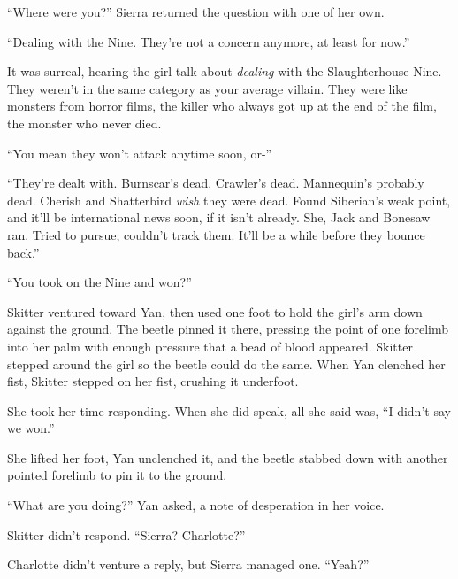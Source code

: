 ``Where were you?'' Sierra returned the question with one of her own.



``Dealing with the Nine.  They're not a concern anymore, at least for now.''



It was surreal, hearing the girl talk about \emph{dealing} with the Slaughterhouse Nine.  They weren't in the same category as your average villain.  They were like monsters from horror films, the killer who always got up at the end of the film, the monster who never died.



``You mean they won't attack anytime soon, or-''



``They're dealt with.  Burnscar's dead.  Crawler's dead.  Mannequin's probably dead.  Cherish and Shatterbird \emph{wish} they were dead.  Found Siberian's weak point, and it'll be international news soon, if it isn't already.  She, Jack and Bonesaw ran.  Tried to pursue, couldn't track them.  It'll be a while before they bounce back.''



``You took on the Nine and won?''



Skitter ventured toward Yan, then used one foot to hold the girl's arm down against the ground.  The beetle pinned it there, pressing the point of one forelimb into her palm with enough pressure that a bead of blood appeared.  Skitter stepped around the girl so the beetle could do the same.  When Yan clenched her fist, Skitter stepped on her fist, crushing it underfoot.



She took her time responding.  When she did speak, all she said was, ``I didn't say we won.''



She lifted her foot, Yan unclenched it, and the beetle stabbed down with another pointed forelimb to pin it to the ground.



``What are you doing?'' Yan asked, a note of desperation in her voice.



Skitter didn't respond.  ``Sierra?  Charlotte?''



Charlotte didn't venture a reply, but Sierra managed one.  ``Yeah?''



